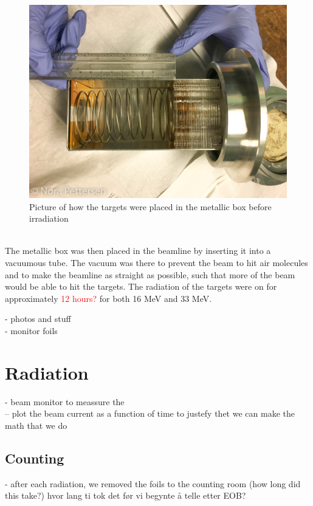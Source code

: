 \documentclass[twoside,english]{uiofysmaster/uiofysmaster}
\begin{document}
\begin{figure} [h]
   \centering
   \includegraphics[scale=.2]{target_stack-1.JPG}
   \caption{Picture of how the targets were placed in the metallic box before irradiation}
   \label{fig:target_stack}
\end{figure}
\\
\noindent
The metallic box was then placed in the beamline by inserting it into a vacuumous tube. The vacuum was there to prevent the beam to hit air molecules and to make the beamline as straight as possible, such that more of the beam would be able to hit the targets. The radiation of the targets were on for approximately \textcolor{red}{12 hours?} for both 16 MeV and 33 MeV. 
\cite{E.Lawrence}


- photos and stuff\\
- monitor foils



\section{Radiation}
\label{sec:radiation}


- beam monitor to meassure the  \\
-- plot the beam current  as a function of time to justefy thet we can make the math that we do


\subsection{Counting}
\label{sec:counting}

- after each radiation, we removed the foils to the counting room (how long did this take?) hvor lang ti tok det før vi begynte å telle etter EOB?
\end{document}
